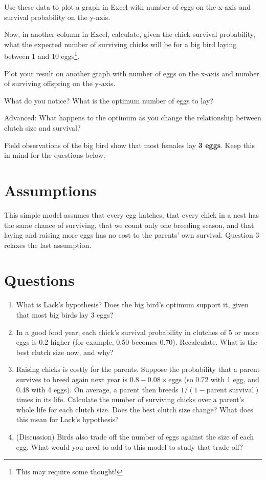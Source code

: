 \documentclass[
  a4paper]{book}
\providecommand{\tightlist}{%
  \setlength{\itemsep}{0pt}\setlength{\parskip}{0pt}}
\begin{document}
Use these data to plot a graph in Excel with number of eggs on the x-axis and survival probability on the y-axis.

Now, in another column in Excel, calculate, given the chick survival probability, what the expected number of surviving chicks will be for a big bird laying between 1 and 10 eggs\footnote{This may require some thought!}.

Plot your result on another graph with number of eggs on the x-axis and number of surviving offspring on the y-axis.

What do you notice? What is the optimum number of eggs to lay?

Advanced: What happens to the optimum as you change the relationship between clutch size and survival?

Field observations of the big bird show that most females lay \textbf{3 eggs}. Keep this in mind for the questions below.

\section{Assumptions}\label{assumptions}

This simple model assumes that every egg hatches, that every chick in a nest has the same chance of surviving, that we count only one breeding season, and that laying and raising more eggs has no cost to the parents' own survival. Question 3 relaxes the last assumption.

\section{Questions}\label{questions-9}

\begin{enumerate}
\def\labelenumi{\arabic{enumi}.}
\tightlist
\item
  What is Lack's hypothesis? Does the big bird's optimum support it, given that most big birds lay 3 eggs?
\item
  In a good food year, each chick's survival probability in clutches of 5 or more eggs is 0.2 higher (for example, 0.50 becomes 0.70). Recalculate. What is the best clutch size now, and why?
\item
  Raising chicks is costly for the parents. Suppose the probability that a parent survives to breed again next year is \(0.8 - 0.08 \times \text{eggs}\) (so 0.72 with 1 egg, and 0.48 with 4 eggs). On average, a parent then breeds \(1 / (1 - \text{parent survival})\) times in its life. Calculate the number of surviving chicks over a parent's whole life for each clutch size. Does the best clutch size change? What does this mean for Lack's hypothesis?
\item
  (Discussion) Birds also trade off the number of eggs against the size of each egg. What would you need to add to this model to study that trade-off?
\end{enumerate}
\end{document}
